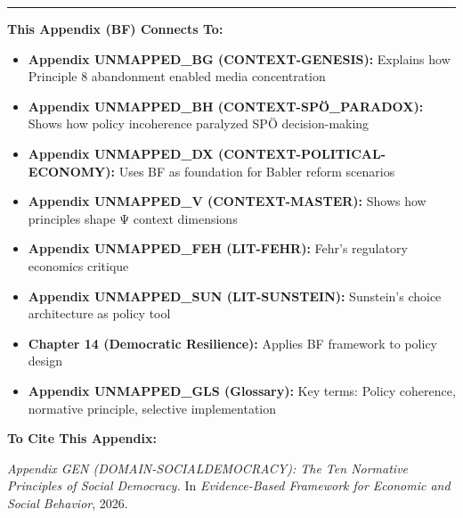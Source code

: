 \nocite{bcm_master}


\vspace{1em}
\hrule
\vspace{0.5em}

\begin{tcolorbox}[colback=orange!5!white, colframe=orange!75!black,
    title=Cross-Reference Links]

\textbf{This Appendix (BF) Connects To:}

\begin{itemize}[nosep]
\item \textbf{Appendix UNMAPPED_BG (CONTEXT-GENESIS):} Explains how Principle 8 abandonment enabled media concentration
\item \textbf{Appendix UNMAPPED_BH (CONTEXT-SPÖ_PARADOX):} Shows how policy incoherence paralyzed SPÖ decision-making
\item \textbf{Appendix UNMAPPED_DX (CONTEXT-POLITICAL-ECONOMY):} Uses BF as foundation for Babler reform scenarios
\item \textbf{Appendix UNMAPPED_V (CONTEXT-MASTER):} Shows how principles shape Ψ context dimensions
\item \textbf{Appendix UNMAPPED_FEH (LIT-FEHR):} Fehr's regulatory economics critique
\item \textbf{Appendix UNMAPPED_SUN (LIT-SUNSTEIN):} Sunstein's choice architecture as policy tool
\item \textbf{Chapter 14 (Democratic Resilience):} Applies BF framework to policy design
\item \textbf{Appendix UNMAPPED_GLS (Glossary):} Key terms: Policy coherence, normative principle, selective implementation
\end{itemize}

\textbf{To Cite This Appendix:}

\textit{Appendix GEN (DOMAIN-SOCIALDEMOCRACY): The Ten Normative Principles of Social Democracy.}
In \textit{Evidence-Based Framework for Economic and Social Behavior}, 2026.

\end{tcolorbox}


